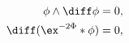 \begin{equation}
\label{G2cond}
\begin{aligned}
   \phi \wedge \diff \phi &= 0 , \\
   \diff (\ex^{-2\Phi} * \phi) &= 0 ,
\end{aligned}
\end{equation}

